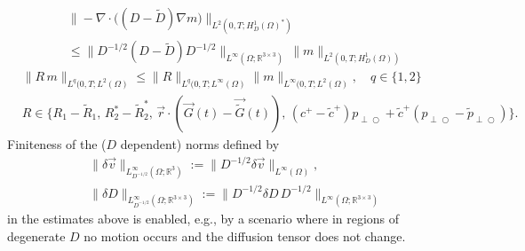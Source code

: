 \documentclass{ws-m3as}
\newcommand{\skipsimple}[1]{}
\def\pp{p_{\perp\!\!\!\!\!\bigcirc}}
\def\pptil{\tilde{p}_{\perp\!\!\!\!\!\bigcirc}}
\begin{document}
\begin{equation*}%
\begin{aligned}
&\|-\nabla\cdot\bigl((D-\tilde{D})\nabla m\bigr)\|_{L^2(0,T;H_D^1(\Omega)^*)}\\
&\skipsimple{
=\Bigl(\int_0^T\Bigl(\sup_{w\in C_c^\infty(\Omega)\setminus\{0\}} \frac{1}{\|w\|_{H_D^1(\Omega)}}
\int_\Omega (D^{-1/2}(D-\tilde{D})D^{-1/2}\, D^{1/2}\nabla m) \cdot D^{-1/2}\nabla w\, d{\vec r}\Bigr)^2 \, dt\Bigr)^{1/2}
}
\leq \|D^{-1/2}(D-\tilde{D})D^{-1/2}\|_{L^\infty(\Omega;\mathbb{R}^{3\times 3})}\, \|m\|_{L^2(0,T;H_D^1(\Omega))}
\end{aligned}
\end{equation*}
\begin{equation}\label{estR}
\begin{aligned}
&\|R\,m\|_{L^q(0,T;L^2(\Omega)}\leq \|R\|_{L^q(0,T;L^\infty(\Omega)}\|m\|_{L^\infty(0,T;L^2(\Omega)}, \quad q\in\{1,2\}\\ 
&R\in\{R_1-\tilde{R}_1,\,R_2^*-\tilde{R}_2^*,\,\vec r \cdot (\vec G(t)-\vec{\tilde{G}}(t)),\,(c^+-\tilde{c}^+)\pp+\tilde{c}^+(\pp-\pptil)\}. 
\end{aligned}
\end{equation}
Finiteness of the ($D$ dependent) norms defined by
\[ 
\begin{aligned}
&\|\delta\vec v\|_{L^\infty_{D^{-1/2}}(\Omega;\mathbb{R}^3)}:=
\|D^{-1/2}{\delta\vec v}\|_{L^\infty(\Omega)}, 
\\
&\|\delta D\|_{L^\infty_{D^{-1/2}}(\Omega;\mathbb{R}^{3\times 3})}:=
\|D^{-1/2}\delta D\,D^{-1/2}\|_{L^\infty(\Omega;\mathbb{R}^{3\times 3})}
\end{aligned}
\]
in the estimates above is enabled, e.g., by a scenario where in regions of degenerate $D$
no motion occurs and the diffusion tensor does not change.  
\end{document}

